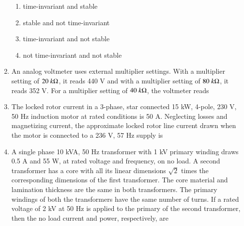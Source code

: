 \documentclass[journal,12pt,onecolumn]{IEEEtran}
\theoremstyle{remark}
\begin{document}
\begin{enumerate}[start=1, label=Q.\arabic*]
\begin{enumerate}
    \item time-invariant and stable
    \item stable and not time-invariant
    \item time-invariant and not stable
    \item not time-invariant and not stable
\end{enumerate}
\hfill{}

\item An analog voltmeter uses external multiplier settings. With a multiplier setting of $20~k\ohm$, it reads 440 V and with a multiplier setting of $80~k\ohm$, it reads 352 V. For a multiplier setting of $40~k\ohm$, the voltmeter reads

\begin{enumerate}
\end{enumerate}
\hfill{}

\item The locked rotor current in a 3-phase, star connected 15 kW, 4-pole, 230 V, 50 Hz induction motor at rated conditions is 50 A. Neglecting losses and magnetizing current, the approximate locked rotor line current drawn when the motor is connected to a 236 V, 57 Hz supply is

\begin{enumerate}
\end{enumerate}
\hfill{}

\item A single phase 10 kVA, 50 Hz transformer with 1 kV primary winding draws 0.5 A and 55 W, at rated voltage and frequency, on no load. A second transformer has a core with all its linear dimensions $\sqrt{2}$ times the corresponding dimensions of the first transformer. The core material and lamination thickness are the same in both transformers. The primary windings of both the transformers have the same number of turns. If a rated voltage of 2 kV at 50 Hz is applied to the primary of the second transformer, then the no load current and power, respectively, are


\end{enumerate}
\end{document}
